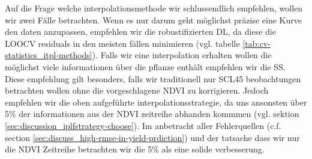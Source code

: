 Auf die Frage welche interpolationsmethode wir schlussendlich empfehlen, wollen wir zwei Fälle betrachten. Wenn es nur darum geht möglichst präzise eine Kurve den daten anzupassen, empfehlen wir die robustifizierten DL, da diese die LOOCV residuals in den meisten fällen minimieren (vgl. tabelle \ref{tab:cv-statistics_itpl-methods}). Falls wir eine interpolation erhalten wollen die möglichst viele informationen über die pflanze enthält empfehlen wir die SS. Diese empfehlung gilt besonders, falls wir traditionell nur SCL45 beobachtungen betrachten wollen ohne die vorgeschlagene NDVI zu korrigieren. Jedoch empfehlen wir die oben aufgeführte interpolationsstrategie, da uns ansonsten über 5\% der informationen aus der NDVI zeitreihe abhanden kommmen (vgl. sektion \ref{sec:discussion_iplfstrategy-choose}). Im anbetracht aller Fehlerquellen (c.f. section \ref{sec:discuss_high-rmse-in-yield-prdiction}) und der tatsache dass wir nur die NDVI Zeitreihe betrachten wir die 5\% als eine solide verbesserung.





